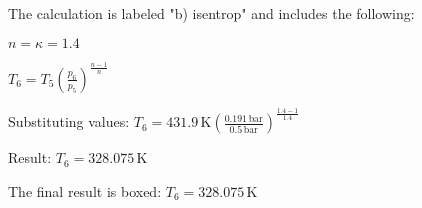 The calculation is labeled "b) isentrop" and includes the following:  

\( n = \kappa = 1.4 \)  

\( T_6 = T_5 \left( \frac{p_6}{p_5} \right)^{\frac{n-1}{n}} \)  

Substituting values:  
\( T_6 = 431.9 \, \text{K} \left( \frac{0.191 \, \text{bar}}{0.5 \, \text{bar}} \right)^{\frac{1.4-1}{1.4}} \)  

Result:  
\( T_6 = 328.075 \, \text{K} \)  

The final result is boxed:  
\( T_6 = 328.075 \, \text{K} \)